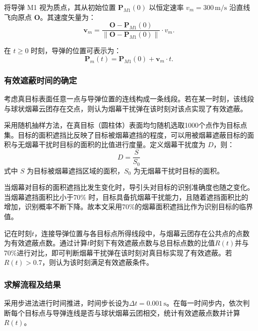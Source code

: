 \documentclass[12pt]{article}
\begin{document}
\begin{CJK}{UTF8}{gbsn}
		将导弹 M1 视为质点，其从初始位置 $\mathbf{P}_{M1}(0)$ 以恒定速率 $v_m = 300 \, \mathrm{m/s}$ 沿直线飞向原点 $\mathbf{O}$。其速度矢量为：
		\begin{equation}
			\mathbf{v}_m = \frac{\mathbf{O} - \mathbf{P}_{M1}(0)}{\| \mathbf{O} - \mathbf{P}_{M1}(0) \|} \cdot v_m.
		\end{equation}
		
		在 $t \geq 0$ 时刻，导弹的位置可表示为：
		\begin{equation}
			\mathbf{P}_m(t) = \mathbf{P}_{M1}(0) + \mathbf{v}_m \cdot t.
		\end{equation}
		
		\subsubsection{有效遮蔽时间的确定}
		
		考虑真目标表面任意一点与导弹位置的连线构成一条线段。若在某一时刻，该线段与球状烟幕云团存在交点，则认为烟幕干扰弹在该时刻对该点实现了有效遮蔽。\cite{1}
		
		采用随机抽样方法，在真目标（圆柱体）表面均匀随机选取1000个点作为目标点集。目标的面积遮挡比反映了目标被烟幕遮挡的程度，可以用被烟幕遮蔽目标的面积与无烟幕干扰时目标的面积的比值进行度量。定义烟幕干扰度为 $D$，则：
		\begin{equation}
			D = \frac{S}{S_0}
		\end{equation}
		式中 $S$ 为目标被烟幕遮挡区域的面积，$S_0$ 为无烟幕干扰时目标的面积。
		
		当烟幕对目标的面积遮挡比发生变化时，导引头对目标的识别准确度也随之变化\cite{2}。当烟幕遮挡面积比小于70\% 时，目标具备抗烟幕干扰能力，且随着遮挡面积比的增加，识别概率不断下降\cite{3}。故本文采用70\%的烟幕面积遮挡比作为识别目标的临界值。
		
		记在时刻$t$，连接导弹位置与各目标点所得线段中，与烟幕云团存在公共点的点数为有效遮蔽点数。通过计算$t$时刻下有效遮蔽点数与总目标点数的比值$R(t)$并与70\%进行对比，即可判断烟幕干扰弹在该时刻对真目标实现了有效遮蔽。若$R(t)>0.7$，则认为该时刻满足有效遮蔽条件。
		
		\subsubsection{求解流程及结果}
		
		采用步进法进行时间推进，时间步长设为$\Delta t = 0.001\,\mathrm{s}$。在每一时间步内，依次判断每个目标点与导弹连线是否与球状烟幕云团相交，统计有效遮蔽点数并计算$R(t)$。
		

\end{CJK}
\end{document}

